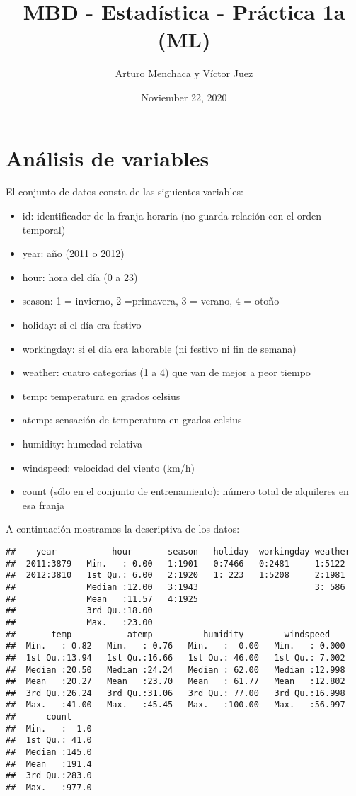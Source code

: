 \documentclass[
]{article}
\title{MBD - Estadística - Práctica 1a (ML)}
\author{Arturo Menchaca y Víctor Juez}
\date{Noviember 22, 2020}
\providecommand{\tightlist}{%
  \setlength{\itemsep}{0pt}\setlength{\parskip}{0pt}}
\begin{document}
\maketitle

\hypertarget{anuxe1lisis-de-variables}{%
\section{Análisis de variables}\label{anuxe1lisis-de-variables}}

El conjunto de datos consta de las siguientes variables:

\begin{itemize}
\tightlist
\item
  id: identificador de la franja horaria (no guarda relación con el
  orden temporal)
\item
  year: año (2011 o 2012)
\item
  hour: hora del día (0 a 23)
\item
  season: 1 = invierno, 2 =primavera, 3 = verano, 4 = otoño
\item
  holiday: si el día era festivo
\item
  workingday: si el día era laborable (ni festivo ni fin de semana)
\item
  weather: cuatro categorías (1 a 4) que van de mejor a peor tiempo
\item
  temp: temperatura en grados celsius
\item
  atemp: sensación de temperatura en grados celsius
\item
  humidity: humedad relativa
\item
  windspeed: velocidad del viento (km/h)
\item
  count (sólo en el conjunto de entrenamiento): número total de
  alquileres en esa franja
\end{itemize}

A continuación mostramos la descriptiva de los datos:

\begin{verbatim}
##    year           hour       season   holiday  workingday weather 
##  2011:3879   Min.   : 0.00   1:1901   0:7466   0:2481     1:5122  
##  2012:3810   1st Qu.: 6.00   2:1920   1: 223   1:5208     2:1981  
##              Median :12.00   3:1943                       3: 586  
##              Mean   :11.57   4:1925                               
##              3rd Qu.:18.00                                        
##              Max.   :23.00                                        
##       temp           atemp          humidity        windspeed     
##  Min.   : 0.82   Min.   : 0.76   Min.   :  0.00   Min.   : 0.000  
##  1st Qu.:13.94   1st Qu.:16.66   1st Qu.: 46.00   1st Qu.: 7.002  
##  Median :20.50   Median :24.24   Median : 62.00   Median :12.998  
##  Mean   :20.27   Mean   :23.70   Mean   : 61.77   Mean   :12.802  
##  3rd Qu.:26.24   3rd Qu.:31.06   3rd Qu.: 77.00   3rd Qu.:16.998  
##  Max.   :41.00   Max.   :45.45   Max.   :100.00   Max.   :56.997  
##      count      
##  Min.   :  1.0  
##  1st Qu.: 41.0  
##  Median :145.0  
##  Mean   :191.4  
##  3rd Qu.:283.0  
##  Max.   :977.0
\end{verbatim}
\end{document}

